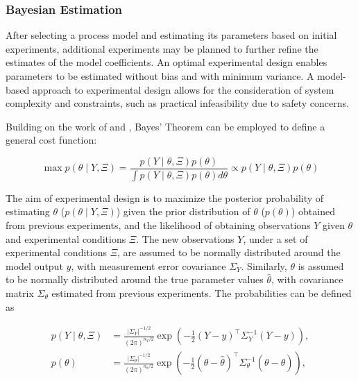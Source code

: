 \documentclass[../Article_Design_of_Experiment.tex]{subfiles}
\begin{document}
	
	\subsubsection{Bayesian Estimation}
	
	After selecting a process model and estimating its parameters based on initial experiments, additional experiments may be planned to further refine the estimates of the model coefficients. An optimal experimental design enables parameters to be estimated without bias and with minimum variance. A model-based approach to experimental design allows for the consideration of system complexity and constraints, such as practical infeasibility due to safety concerns.
	
	Building on the work of\citet{Walter2010} and \citet{Himmelblau1970}, Bayes' Theorem can be employed to define a general cost function:
	
	{\footnotesize
		\begin{equation}
			\max p\left(\theta \mid Y, \Xi \right) = \frac{p\left(Y \mid \theta, \Xi\right) p\left(\theta\right)}{\int p\left(Y \mid \theta, \Xi\right) p\left(\theta\right) d\theta} \propto p\left(Y \mid \theta, \Xi\right) p\left(\theta\right)
		\end{equation}
	}
	
	The aim of experimental design is to maximize the posterior probability of estimating $\theta$ ($p\left(\theta \mid Y, \Xi \right)$) given the prior distribution of $\theta$ ($p(\theta)$) obtained from previous experiments, and the likelihood of obtaining observations $Y$ given $\theta$ and experimental conditions $\Xi$. The new observations $Y$, under a set of experimental conditions $\Xi$, are assumed to be normally distributed around the model output $y$, with measurement error covariance $\Sigma_Y$. Similarly, $\theta$ is assumed to be normally distributed around the true parameter values $\hat{\theta}$, with covariance matrix $\Sigma_\theta$ estimated from previous experiments. The probabilities can be defined as
	
	{\footnotesize
		\begin{align} 
			p\left(Y \mid \theta, \Xi \right) &= \frac{|\Sigma_Y|^{-1/2}}{\left(2\pi\right)^{n_Y/2}} \exp\left( -\frac{1}{2} \left(Y - y\right)^\top \Sigma_Y^{-1} \left(Y - y\right) \right), \\ 
			p\left(\theta\right) &= \frac{|\Sigma_\theta|^{-1/2}}{\left(2\pi\right)^{n_\theta/2}} \exp\left( -\frac{1}{2} \left(\theta - \hat{\theta}\right)^\top \Sigma_\theta^{-1} \left(\theta - \hat{\theta}\right) \right),
		\end{align}
	}
	
\end{document}
